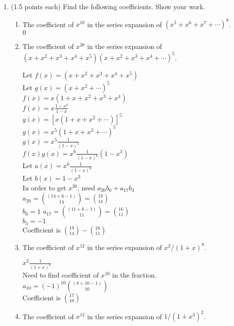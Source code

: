 \documentclass[11pt]{article}
\begin{document}
\begin{enumerate}
\begin{enumerate}
\end{enumerate}

\item (1.5 points each) Find the following coefficients.  Show your work.
\begin{enumerate}
\item The coefficient of $x^{10}$ in the series expansion of 
$(x^5+x^6 + x^7+ \cdots)^8$.\\
$0$
\item The coefficient of $x^{20}$ in the series expansion of 
$(x+x^2 + x^3+x^4+x^5) (x+x^2 + x^3+x^4+\cdots)^5 $.

Let $f(x) = (x + x^2 + x^3 + x^4 + x^5)$\\
Let $g(x) = (x + x^2 + \cdots)^5$\\
$f(x) = x(1 + x + x^2 + x^3 + x^4)$\\
$f(x) = x \frac{1-x^3}{1-x}$\\
$g(x) = [x(1 + x + x^2 + \cdots)]^5$\\
$g(x) = x^5(1 + x + x^2+ \cdots)^5$\\
$g(x) = x^5 \frac{1}{(1-x)^5}$\\
$f(x)g(x) = x^6 \frac{1}{(1-x)^6} (1 - x^3)$\\
Let $a(x) = x^6 \frac{1}{(1-x)^6}$\\
Let $b(x) = 1 - x^3$\\
In order to get $x^{20}$, need $a_{20}b_{0} + a_{17}b_{3}$\\
$a_{20} = {(14 + 6 - 1) \choose 14} = {19 \choose 14}$\\
$b_{0} = 1$
$a_{17} = {(11 + 6 -1) \choose 11} = {16 \choose 11}$\\
$b_{3} = -1$\\
Coefficient is ${19 \choose 14} - {16 \choose 11}$

\item The coefficient of $x^{12}$ in the series expansion of
$x^2/(1+x)^8$.

$x^2 \frac{1}{(1+x)^8}$\\
Need to find coefficient of $x^{10}$ in the fraction.\\
$a_{10} = (-1)^{10} {(8+10-1) \choose 10}$\\
Coefficient is ${17 \choose 10}$

\item The coefficient of $x^{12}$ in the series expansion of
$1/(1+x^3)^2$.
\end{enumerate}

\end{enumerate}
\end{document}
